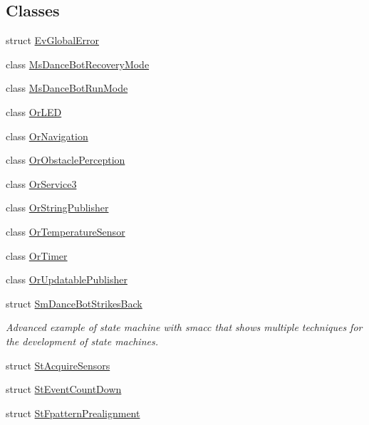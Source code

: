 \subsection*{Classes}
\begin{DoxyCompactItemize}
\item 
struct \hyperlink{structsm__dance__bot__strikes__back_1_1EvGlobalError}{Ev\+Global\+Error}
\item 
class \hyperlink{classsm__dance__bot__strikes__back_1_1MsDanceBotRecoveryMode}{Ms\+Dance\+Bot\+Recovery\+Mode}
\item 
class \hyperlink{classsm__dance__bot__strikes__back_1_1MsDanceBotRunMode}{Ms\+Dance\+Bot\+Run\+Mode}
\item 
class \hyperlink{classsm__dance__bot__strikes__back_1_1OrLED}{Or\+L\+ED}
\item 
class \hyperlink{classsm__dance__bot__strikes__back_1_1OrNavigation}{Or\+Navigation}
\item 
class \hyperlink{classsm__dance__bot__strikes__back_1_1OrObstaclePerception}{Or\+Obstacle\+Perception}
\item 
class \hyperlink{classsm__dance__bot__strikes__back_1_1OrService3}{Or\+Service3}
\item 
class \hyperlink{classsm__dance__bot__strikes__back_1_1OrStringPublisher}{Or\+String\+Publisher}
\item 
class \hyperlink{classsm__dance__bot__strikes__back_1_1OrTemperatureSensor}{Or\+Temperature\+Sensor}
\item 
class \hyperlink{classsm__dance__bot__strikes__back_1_1OrTimer}{Or\+Timer}
\item 
class \hyperlink{classsm__dance__bot__strikes__back_1_1OrUpdatablePublisher}{Or\+Updatable\+Publisher}
\item 
struct \hyperlink{structsm__dance__bot__strikes__back_1_1SmDanceBotStrikesBack}{Sm\+Dance\+Bot\+Strikes\+Back}
\begin{DoxyCompactList}\small\item\em Advanced example of state machine with smacc that shows multiple techniques for the development of state machines. \end{DoxyCompactList}\item 
struct \hyperlink{structsm__dance__bot__strikes__back_1_1StAcquireSensors}{St\+Acquire\+Sensors}
\item 
struct \hyperlink{structsm__dance__bot__strikes__back_1_1StEventCountDown}{St\+Event\+Count\+Down}
\item 
struct \hyperlink{structsm__dance__bot__strikes__back_1_1StFpatternPrealignment}{St\+Fpattern\+Prealignment}

\end{DoxyCompactItemize}
